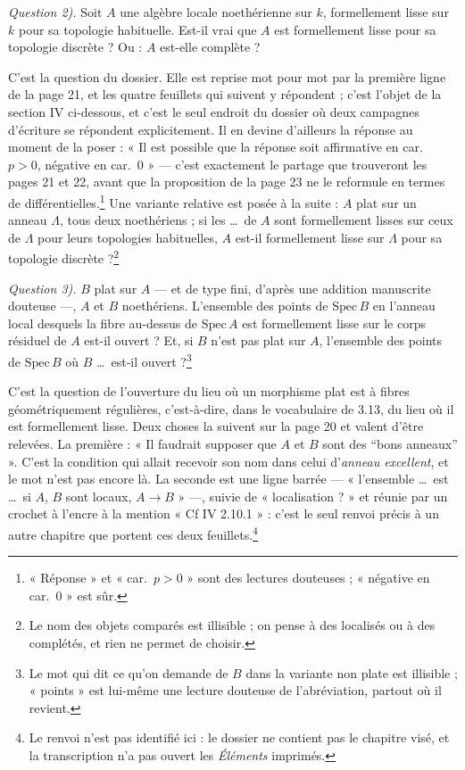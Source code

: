 \documentclass[11pt,a4paper]{article}
\begin{document}
\emph{Question 2).} Soit $A$ une algèbre locale noethérienne sur $k$,
formellement lisse sur $k$ pour sa topologie habituelle. Est-il vrai que $A$
est formellement lisse pour sa topologie discrète ? Ou : $A$ est-elle
complète ?

C'est la question du dossier. Elle est reprise mot pour mot par la première
ligne de la page 21, et les quatre feuillets qui suivent y répondent ; c'est
l'objet de la section IV ci-dessous, et c'est le seul endroit du dossier où
deux campagnes d'écriture se répondent explicitement. Il en devine d'ailleurs
la réponse au moment de la poser : « Il est possible que la réponse soit
affirmative en car.\ $p > 0$, négative en car.\ $0$ » — c'est exactement le
partage que trouveront les pages 21 et 22, avant que la proposition de la page
23 ne le reformule en termes de différentielles.\footnote{« Réponse » et
« car.\ $p > 0$ » sont des lectures douteuses ; « négative en car.\ $0$ » est
sûr.} Une variante relative est posée à la suite : $A$ plat sur un anneau
$\Lambda$, tous deux noethériens ; si les \ldots\ de $A$ sont formellement
lisses sur ceux de $\Lambda$ pour leurs topologies habituelles, $A$ est-il
formellement lisse sur $\Lambda$ pour sa topologie discrète ?\footnote{Le nom
des objets comparés est illisible ; on pense à des localisés ou à des
complétés, et rien ne permet de choisir.}

\emph{Question 3).} $B$ plat sur $A$ — et de type fini, d'après une addition
manuscrite douteuse —, $A$ et $B$ noethériens. L'ensemble des points de
$\mathrm{Spec}\,B$ en l'anneau local desquels la fibre au-dessus de
$\mathrm{Spec}\,A$ est formellement lisse sur le corps résiduel de $A$ est-il
ouvert ? Et, si $B$ n'est pas plat sur $A$, l'ensemble des points de
$\mathrm{Spec}\,B$ où $B$ \ldots\ est-il ouvert ?\footnote{Le mot qui dit ce
qu'on demande de $B$ dans la variante non plate est illisible ; « points »
est lui-même une lecture douteuse de l'abréviation, partout où il revient.}

C'est la question de l'ouverture du lieu où un morphisme plat est à fibres
géométriquement régulières, c'est-à-dire, dans le vocabulaire de 3.13, du lieu
où il est formellement lisse. Deux choses la suivent sur la page 20 et valent
d'être relevées. La première : « Il faudrait supposer que $A$ et $B$ sont des
“bons anneaux” ». C'est la condition qui allait recevoir son nom dans celui
d'\emph{anneau excellent}, et le mot n'est pas encore là. La seconde est une
ligne barrée — « l'ensemble \ldots\ est \ldots\ si $A$, $B$ sont locaux,
$A \to B$ » —, suivie de « localisation ? » et réunie par un crochet à l'encre à
la mention « Cf IV 2.10.1 » : c'est le seul renvoi précis à un autre chapitre
que portent ces deux feuillets.\footnote{Le renvoi n'est pas identifié ici : le
dossier ne contient pas le chapitre visé, et la transcription n'a pas ouvert
les \emph{Éléments} imprimés.}
\end{document}
